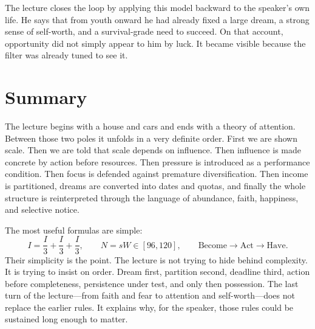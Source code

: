 \begin{figure}
\centering
{}
\end{figure}

The lecture closes the loop by applying this model backward to the speaker's own life. He says that from youth onward he had already fixed a large dream, a strong sense of self-worth, and a survival-grade need to succeed. On that account, opportunity did not simply appear to him by luck. It became visible because the filter was already tuned to see it.

\section{Summary}

The lecture begins with a house and cars and ends with a theory of attention. Between those two poles it unfolds in a very definite order. First we are shown scale. Then we are told that scale depends on influence. Then influence is made concrete by action before resources. Then pressure is introduced as a performance condition. Then focus is defended against premature diversification. Then income is partitioned, dreams are converted into dates and quotas, and finally the whole structure is reinterpreted through the language of abundance, faith, happiness, and selective notice.

The most useful formulas are simple:
\[
I = \frac{I}{3} + \frac{I}{3} + \frac{I}{3},
\qquad
N = sW \in [96,120],
\qquad
\text{Become} \to \text{Act} \to \text{Have}.
\]
Their simplicity is the point. The lecture is not trying to hide behind complexity. It is trying to insist on order. Dream first, partition second, deadline third, action before completeness, persistence under test, and only then possession. The last turn of the lecture---from faith and fear to attention and self-worth---does not replace the earlier rules. It explains why, for the speaker, those rules could be sustained long enough to matter.
